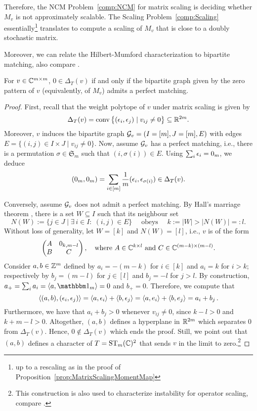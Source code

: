 Therefore, the NCM Problem~\ref{comp:NCM} for matrix scaling is deciding whether $M_v$ is not approximately scalable. The Scaling Problem~\ref{comp:Scaling} essentially\footnote{up to a rescaling as in the proof of Proposition~\ref{prop:MatrixScalingMomentMap}} translates to compute a scaling of $M_v$ that is close to a doubly stochastic matrix.

Moreover, we can relate the Hilbert-Mumford characterization to bipartite matching, also compare \cite[Corollary~3.5]{gargOliveira2018Survey}.

\begin{prop}\label{prop:MatrixScalingHilbertMumford}
	For $v \in \mathbb C^{m \times m}$, $0 \in \Delta_T(v)$ if and only if the bipartite graph given by the zero pattern of $v$ (equivalently, of $M_v$) admits a perfect matching.
\end{prop}

\begin{proof}
	First, recall that the weight polytope of $v$ under matrix scaling is given by
		\[ \Delta_{T}(v) = \operatorname{conv} \big\lbrace (\epsilon_i, \epsilon_j) \mid v_{ij} \neq 0 \big\rbrace \subseteq \mathbb R^{2m} . \]
	Moreover, $v$ induces the bipartite graph $\mathcal{G}_v = (I = [m], J=[m], E)$ with edges $E = \{ (i,j) \in I \times J \mid v_{ij}\neq0\}$. Now, assume $\mathcal{G}_v$ has a perfect matching, i.e., there is a permutation $\sigma \in \mathfrak{S}_m$ such that $(i, \sigma(i)) \in E$. Using $\sum_i \epsilon_i = 0_m$, we deduce
		\[ (0_m, 0_m) = \sum_{i \in [m]} \frac{1}{m} (\epsilon_i, \epsilon_{\sigma(i)}) \in \Delta_{T}(v). \]
		
	Conversely, assume $\mathcal{G}_v$ does not admit a perfect matching. By Hall's marriage theorem \cite{HallMarriage}, there is a set $W \subseteq I$ such that its neighbour set
		\[N(W) := \big\{ j \in J \mid \exists \, i \in I \colon \; (i,j) \in E \big\} \quad
		\text{ obeys } \quad k := |W| >|N(W)| =: l. \]
	Without loss of generality, let $W = [k]$ and $N(W) = [l]$, i.e., $v$ is of the form
		\[ \begin{pmatrix}
			A & 0_{k, m-l} \\ B & C
		\end{pmatrix}, \quad \text{where } A \in \mathbb C^{k \times l} \text{ and } C \in \mathbb C^{(m-k) \times (m-l)}.\]
	Consider $a,b \in \mathbb Z^m$ defined by $a_i = -(m-k)$ for $i \in [k]$ and $a_i = k$ for $i > k$; respectively by $b_j = (m-l)$ for $j \in [l]$ and $b_j = -l$ for $j > l$.  By construction, $a_+ = \sum_i a_i = \langle a, \ones_m \rangle = 0$ and $b_+ = 0$. Therefore, we compute that
		\[ \langle (a,b), (\epsilon_i, \epsilon_j) \rangle = \langle a, \epsilon_i \rangle + \langle b, \epsilon_j \rangle
		= \langle a, e_i \rangle + \langle b, e_j \rangle = a_i + b_j \, . \]
	Furthermore, we have that $a_i + b_j > 0$ whenever $v_{ij} \neq 0$, since $k-l > 0$ and $k + m - l > 0$. Altogether, $(a,b)$ defines a hyperplane in $\mathbb R^{2m}$ which separates $0$ from $\Delta_T(v)$. Hence, $0 \notin \Delta_T(v)$ which ends the proof. Still, we point out that $(a,b)$ defines a character of $T = \operatorname{ST}_m(\mathbb C)^2$ that sends $v$ in the limit to zero.\footnote{This construction is also used to characterize instability for operator scaling, compare \cite[Proof of Theorem~2.1, part one]{BurginDraisma}.}
\end{proof}

